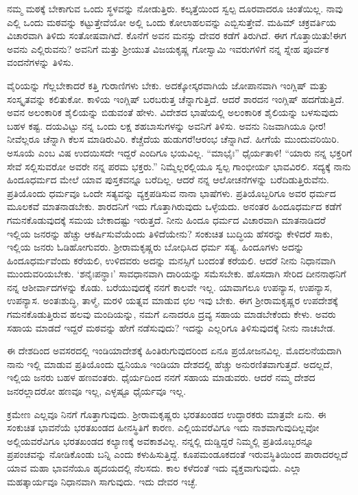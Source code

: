 ನಮ್ಮ ಮಠಕ್ಕೆ ಬೇಕಾಗುವ ಒಂದು ಸ್ಥಳವನ್ನು ನೋಡುತ್ತಿರು. ಕಲ್ಕತ್ತೆಯಿಂದ ಸ್ವಲ್ಪ ದೂರವಾದರೂ ಚಿಂತೆಯಿಲ್ಲ. ನಾವು ಎಲ್ಲಿ ಒಂದು ಮಠವನ್ನು ಕಟ್ಟುತ್ತೇವೆಯೋ ಅಲ್ಲಿ ಒಂದು ಕೋಲಾಹಲವನ್ನು ಎಬ್ಬಿಸುತ್ತೇವೆ. ಮಹಿಮ್ ಚಕ್ರವರ್ತಿಯ ವಿಚಾರವಾಗಿ ತಿಳಿದು ಸಂತೋಷವಾಗಿದೆ. ಕೊನೆಗೆ ಅವನ ಮನಸ್ಸು ದೇವರ ಕಡೆಗೆ ತಿರುಗಿದೆ. ಈಗ ಗೊತ್ತಾಯಿತು!ಈಗ ಅವನು ಎಲ್ಲಿರುವನು? ಅವನಿಗೆ ಮತ್ತು ಶ‍್ರೀಯುತ ವಿಜಯಕೃಷ್ಣ ಗೋಸ್ವಾಮಿ ಇವರುಗಳಿಗೆ ನನ್ನ ಸ್ನೇಹ ಪೂರ್ವಕ ವಂದನೆಗಳನ್ನು ತಿಳಿಸು.

ವೈರಿಯನ್ನು ಗೆಲ್ಲಬೇಕಾದರೆ ಕತ್ತಿ ಗುರಾಣಿಗಳು ಬೇಕು. ಅದಕ್ಕೋಸ್ಕರವಾಗಿಯೆ ಜೋಪಾನವಾಗಿ ಇಂಗ್ಲಿಷ್ ಮತ್ತು ಸಂಸ್ಕೃತವನ್ನು ಕಲಿತುಕೋ. ಕಾಳಿಯ ಇಂಗ್ಲಿಷ್ ಬರಬರುತ್ತ ಚೆನ್ನಾಗುತ್ತಿದೆ. ಆದರೆ ಶಾರದನ ಇಂಗ್ಲಿಷ್ ಹದಗೆಡುತ್ತಿದೆ. ಅವನ ಅಲಂಕಾರಿಕ ಶೈಲಿಯನ್ನು ಬಿಡುವಂತೆ ಹೇಳು. ವಿದೇಶದ ಭಾಷೆಯಲ್ಲಿ ಅಲಂಕಾರಿಕ ಶೈಲಿಯನ್ನು ಬಳಸುವುದು ಬಹಳ ಕಷ್ಟ. ದಯವಿಟ್ಟು ನನ್ನ ಒಂದು ಲಕ್ಷ ಶಹಬಾಸುಗಳನ್ನು ಅವನಿಗೆ ತಿಳಿಸು. ಅವನು ನಿಜವಾಗಿಯೂ ಧೀರ! ನೀವೆಲ್ಲರೂ ಚೆನ್ನಾಗಿ ಕೆಲಸ ಮಾಡಿರುವಿರಿ. ಕೆಚ್ಚೆದೆಯ ಹುಡುಗರೆ!ಆರಂಭ ಚೆನ್ನಾಗಿದೆ. ಹೀಗೆಯೆ ಮುಂದುವರಿಯಿರಿ. ಅಸೂಯೆ ಎಂಬ ವಿಷ ಉದಯಿಸದೇ ಇದ್ದರೆ ಎಂದಿಗೂ ಭಯವಿಲ್ಲ. “ಮಾಭೈಃ” ಧೈರ್ಯತಾಳಿ! “ಯಾರು ನನ್ನ ಭಕ್ತರಿಗೆ ಸೇವೆ ಸಲ್ಲಿಸುವರೋ ಅವರೇ ನನ್ನ ಪರಮ ಭಕ್ತರು.” ನಿಮ್ಮೆಲ್ಲರಲ್ಲಿಯೂ ಸ್ವಲ್ಪ ಗಾಂಭೀರ್ಯ ಭಾವವಿರಲಿ. ಸದ್ಯಕ್ಕೆ ನಾನು ಹಿಂದೂಧರ್ಮದ ಮೇಲೆ ಯಾವ ಪುಸ್ತಕವನ್ನೂ ಬರೆದಿಲ್ಲ. ಆದರೆ ನನ್ನ ಆಲೋಚನೆಗಳನ್ನು ಬರೆದಿಡುತ್ತಿರುವೆನು. ಪ್ರತಿಯೊಂದು ಧರ್ಮವೂ ಒಂದೇ ಸತ್ಯವನ್ನು ವ್ಯಕ್ತಪಡಿಸುವ ನಾನಾ ಭಾಷೆಗಳು. ಪ್ರತಿಯೊಬ್ಬರಿಗೂ ಅವರ ಧರ್ಮದ ಮೂಲಕವೆ ಮಾತನಾಡಬೇಕು. ಶಾರದನಿಗೆ ಇದು ಗೊತ್ತಾಗಿರುವುದು ಒಳ್ಳೆಯದು. ಅನಂತರ ಹಿಂದೂಧರ್ಮದ ಕಡೆಗೆ ಗಮನಕೊಡುವುದಕ್ಕೆ ಸಮಯ ಬೇಕಾದಷ್ಟು ಇರುತ್ತದೆ. ನೀನು ಹಿಂದೂ ಧರ್ಮದ ವಿಚಾರವಾಗಿ ಮಾತನಾಡಿದರೆ ಇಲ್ಲಿಯ ಜನರನ್ನು ಹೆಚ್ಚು ಆಕರ್ಷಿಸುವೆಯೆಂದು ತಿಳಿದೆಯೇನು? ಸಂಕುಚಿತ ಬುದ್ಧಿಯ ಹೆಸರನ್ನು ಕೇಳಿದರೆ ಸಾಕು, ಇಲ್ಲಿಯ ಜನರು ಓಡಿಹೋಗುವರು. ಶ‍್ರೀರಾಮಕೃಷ್ಣರು ಬೋಧಿಸಿದ ಧರ್ಮ ಸತ್ಯ. ಹಿಂದೂಗಳು ಅದನ್ನು ಹಿಂದೂಧರ್ಮವೆಂದು ಕರೆಯಲಿ, ಉಳಿದವರು ಅದನ್ನು ಮನಸ್ಸಿಗೆ ಬಂದಂತೆ ಕರೆಯಲಿ. ಆದರೆ ನೀನು ನಿಧಾನವಾಗಿ ಮುಂದುವರಿಯಬೇಕು. `ಶನೈಃಪನ್ಥಾಃ' ಸಾವಧಾನವಾಗಿ ದಾರಿಯನ್ನು ಸಮೆಸಬೇಕು. ಹೊಸದಾಗಿ ಸೇರಿದ ದೀನನಾಥನಿಗೆ ನನ್ನ ಆಶೀರ್ವಾದಗಳನ್ನು ಕೊಡು. ಬರೆಯುವುದಕ್ಕೆ ನನಗೆ ಕಾಲವೇ ಇಲ್ಲ. ಯಾವಾಗಲೂ ಉಪನ್ಯಾಸ, ಉಪನ್ಯಾಸ, ಉಪನ್ಯಾಸ. ಅಂತಃಶುದ್ಧಿ, ತಾಳ್ಮೆ, ಮರಳಿ ಯತ್ನವ ಮಾಡುವ ಛಲ ಇವು ಬೇಕು. ಈಗ ಶ‍್ರೀರಾಮಕೃಷ್ಣರ ಉಪದೇಶಕ್ಕೆ ಗಮನಕೊಡುತ್ತಿರುವ ಹಲವು ಮಂದಿಯನ್ನು, ನಮಗೆ ಏನಾದರೂ ದ್ರವ್ಯ ಸಹಾಯ ಮಾಡಬೇಕೆಂದು ಕೇಳು. ಅವರು ಸಹಾಯ ಮಾಡದೆ ಇದ್ದರೆ ಮಠವನ್ನು ಹೇಗೆ ನಡೆಸುವುದು? ಇದನ್ನು ಎಲ್ಲರಿಗೂ ತಿಳಿಸುವುದಕ್ಕೆ ನೀನು ನಾಚಬೇಡ.

ಈ ದೇಶದಿಂದ ಅವಸರದಲ್ಲಿ ಇಂಡಿಯಾದೇಶಕ್ಕೆ ಹಿಂತಿರುಗುವುದರಿಂದ ಏನೂ ಪ್ರಯೋಜನವಿಲ್ಲ. ಮೊದಲನೆಯದಾಗಿ ನಾನು ಇಲ್ಲಿ ಮಾಡುವ ಪ್ರತಿಯೊಂದು ಧ್ವನಿಯೂ ಇಂಡಿಯಾ ದೇಶದಲ್ಲಿ ಹೆಚ್ಚು ಅನುರಣಿತವಾಗುತ್ತದೆ. ಅದಲ್ಲದೆ, ಇಲ್ಲಿಯ ಜನರು ಬಹಳ ಹಣವಂತರು. ಧೈರ್ಯದಿಂದ ನನಗೆ ಸಹಾಯ ಮಾಡುವರು. ಆದರೆ ನಮ್ಮ ದೇಶದ ಜನರಲ್ಲಾದರೋ ಹಣವೂ ಇಲ್ಲ, ಎಳ್ಳಷ್ಟೂ ಧೈರ್ಯವೂ ಇಲ್ಲ.

ಕ್ರಮೇಣ ಎಲ್ಲವೂ ನಿನಗೆ ಗೊತ್ತಾಗುವುದು. ಶ‍್ರೀರಾಮಕೃಷ್ಣರು ಭರತಖಂಡದ ಉದ್ಧಾರಕರು ಮಾತ್ರವೇ ಏನು. ಈ ಸಂಕುಚಿತ ಭಾವನೆಯೆ ಭರತಖಂಡದ ಹೀನಸ್ಥಿತಿಗೆ ಕಾರಣ. ಎಲ್ಲಿಯವರೆವಿಗೂ ಇದು ನಾಶವಾಗುವುದಿಲ್ಲವೋ ಅಲ್ಲಿಯವರೆವಿಗೂ ಭರತಖಂಡದ ಕಲ್ಯಾಣಕ್ಕೆ ಅವಕಾಶವಿಲ್ಲ. ನನ್ನಲ್ಲಿ ದುಡ್ಡಿದ್ದರೆ ನಿಮ್ಮಲ್ಲಿ ಪ್ರತಿಯೊಬ್ಬರನ್ನೂ ಪ್ರಪಂಚವನ್ನು ನೋಡಿಕೊಂಡು ಬನ್ನಿ ಎಂದು ಕಳುಹಿಸುತ್ತಿದ್ದೆ. ಕೂಪಮಂಡೂಕದಂತೆ ಇರುವಸ್ಥಿತಿಯಿಂದ ಪಾರಾದರಲ್ಲದೆ ಯಾವ ಮಹಾ ಭಾವನೆಯೂ ಹೃದಯದಲ್ಲಿ ನೆಲಸದು. ಕಾಲ ಕಳೆದಂತೆ ಇದು ವ್ಯಕ್ತವಾಗುವುದು. ಎಲ್ಲಾ ಮಹತ್ಕಾರ್ಯವೂ ನಿಧಾನವಾಗಿ ಸಾಗುವುದು. ಇದು ದೇವರ ಇಚ್ಛೆ.

